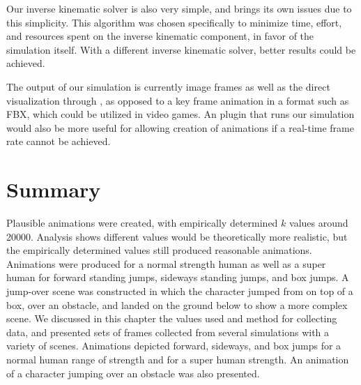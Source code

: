 Our inverse kinematic solver is also very simple, and brings its own issues due to this simplicity.  This algorithm was chosen specifically to minimize time, effort, and resources spent on the inverse kinematic component, in favor of the simulation itself.  With a different inverse kinematic solver, better results could be achieved.

The output of our simulation is currently image frames as well as the direct visualization through \unity{}, as opposed to a key frame animation in a format such as FBX, which could be utilized in video games.  An \maya{}  plugin that runs our simulation would also be more useful for allowing creation of animations if a real-time frame rate cannot be achieved.

\section{Summary}
\label{section:results_summary}
Plausible animations were created, with empirically determined $k$ values around 20000.  Analysis shows different values would be theoretically more realistic, but the empirically determined values still produced reasonable animations.  Animations were produced for a normal strength human as well as a super human for forward standing jumps, sideways standing jumps, and box jumps.  A jump-over scene was constructed in which the character jumped from on top of a box, over an obstacle, and landed on the ground below to show a more complex scene.  We discussed in this chapter the values used and method for collecting data, and presented sets of frames collected from several simulations with a variety of scenes.  Animations depicted forward, sideways, and box jumps for a normal human range of strength and for a super human strength.  An animation of a character jumping over an obstacle was also presented.